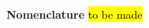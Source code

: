 \textbf{\large Nomenclature}
\hl{to be made}
\begin{multicols}{2}



























\end{multicols}